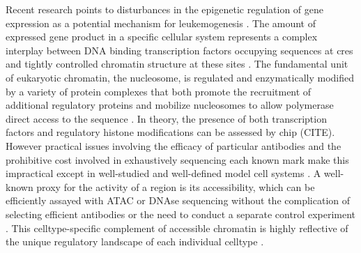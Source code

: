 

Recent research points to disturbances in the epigenetic regulation of gene expression as a potential mechanism for leukemogenesis \cite{Krivtsov2007}. The amount of expressed gene product in a specific cellular system represents a complex interplay between DNA binding transcription factors occupying sequences at \glspl{cre} and tightly controlled chromatin structure at these sites \cite{Cierpicki2010}. The fundamental unit of eukaryotic chromatin, the nucleosome, is regulated and enzymatically modified by a variety of protein complexes that both promote the recruitment of additional regulatory proteins and mobilize nucleosomes to allow polymerase direct access to the sequence \cite{Klemm2019a,Hu2016}. In theory, the presence of both transcription factors and regulatory histone modifications can be assessed by \gls{chip} (CITE). However practical issues involving the efficacy of particular antibodies and the prohibitive cost involved in exhaustively sequencing each known mark make this impractical except in well-studied and well-defined model cell systems \cite{Park2009}. A well-known proxy for the activity of a region is its accessibility, which can be efficiently assayed with ATAC or DNAse sequencing without the complication of selecting efficient antibodies or the need to conduct a separate control experiment \cite{Song2011,Minnoye2021,Thurman2012,Boyle2008}. This celltype-specific complement of accessible chromatin is highly reflective of the unique regulatory landscape of each individual celltype \cite{Thurman2012,Zhang2021,Schulz2019}. 

